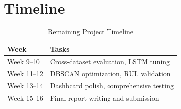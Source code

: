 \documentclass{CLS_zhou430}
\begin{document}
\section{Timeline}
\begin{table}[h]
    \centering
    \caption{Remaining Project Timeline}
    \begin{tabular}{|l|l|}
        \hline \hline
        Week & Tasks \\ \hline
        Week 9--10 & Cross-dataset evaluation, LSTM tuning \\ \hline
        Week 11--12 & DBSCAN optimization, RUL validation \\ \hline
        Week 13--14 & Dashboard polish, comprehensive testing \\ \hline
        Week 15--16 & Final report writing and submission \\ \hline
        \hline
    \end{tabular}
    \label{tab:timeline}
\end{table}





\end{document}
